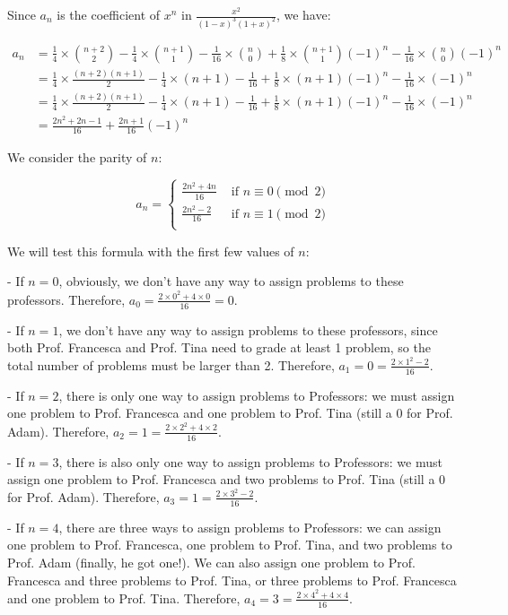 \documentclass[10pt]{article}
\begin{document}
\begin{enumerate}
\begin{enumerate}
Since $a_n$ is the coefficient of $x^n$ in $\frac{x^2}{(1-x)^3(1+x)^2}$, we have:

\begin{align*}
a_n &= \frac{1}{4} \times \binom{n+2}{2} - \frac{1}{4}\times \binom{n+1}{1} -\frac{1}{16} \times \binom{n}{0}+ \frac{1}{8} \times \binom{n+1}{1}(-1)^n - \frac{1}{16} \times \binom{n}{0}(-1)^n \\
&= \frac{1}{4} \times \frac{(n+2)(n+1)}{2} - \frac{1}{4}\times (n+1) -\frac{1}{16} + \frac{1}{8} \times (n+1)(-1)^n - \frac{1}{16} \times (-1)^n \\
&= \frac{1}{4} \times \frac{(n+2)(n+1)}{2} - \frac{1}{4}\times (n+1) -\frac{1}{16} + \frac{1}{8} \times (n+1)(-1)^n - \frac{1}{16} \times (-1)^n \\
&= \frac{2n^2+2n-1}{16}+\frac{2n+1}{16}(-1)^n
\end{align*}

We consider the parity of $n$:

\[a_n=\begin{cases}
\frac{2n^2+4n}{16} & \text{ if } n \equiv 0 \pmod2\\
\frac{2n^2-2}{16} & \text{ if } n \equiv 1 \pmod2\\
\end{cases}\]
\end{enumerate}

We will test this formula with the first few values of $n$:

- If $n=0$, obviously, we don't have any way to assign problems to these professors. Therefore, $a_0 = \frac{2\times 0^2+4\times 0}{16} = 0$.

- If $n=1$, we don't have any way to assign problems to these professors, since both Prof. Francesca and Prof. Tina need to grade at least 1 problem, so the total number of problems must be larger than 2. Therefore, $a_1 = 0 = \frac{2\times 1^2-2}{16}$.

- If $n=2$, there is only one way to assign problems to Professors: we must assign one problem to Prof. Francesca and one problem to Prof. Tina (still a 0 for Prof. Adam). Therefore, $a_2 = 1 = \frac{2\times 2^2+4\times 2}{16}$.

- If $n=3$, there is also only one way to assign problems to Professors: we must assign one problem to Prof. Francesca and two problems to Prof. Tina (still a 0 for Prof. Adam). Therefore, $a_3 = 1 = \frac{2\times 3^2-2}{16}$.

- If $n=4$, there are three ways to assign problems to Professors: we can assign one problem to Prof. Francesca, one problem to Prof. Tina, and two problems to Prof. Adam (finally, he got one!). We can also assign one problem to Prof. Francesca and three problems to Prof. Tina, or three problems to Prof. Francesca and one problem to Prof. Tina. Therefore, $a_4 = 3 = \frac{2\times 4^2+4\times 4}{16}$.


\end{enumerate}
\end{document}
